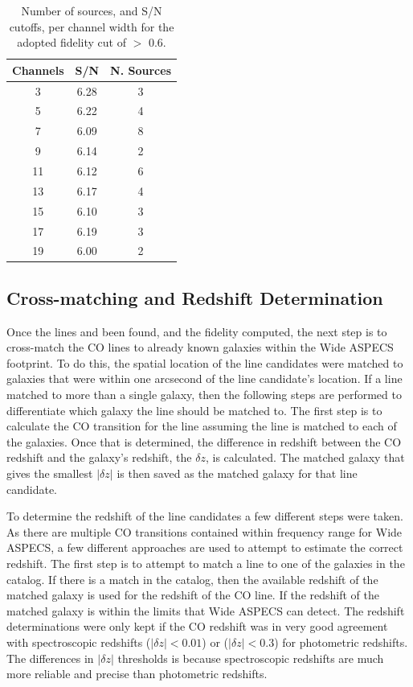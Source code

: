 \begin{table}
\centering
\caption{Number of sources, and S/N cutoffs, per channel width for the adopted fidelity cut of $>$ 0.6.}
\begin{tabular}{ccc}
Channels & S/N & N. Sources \\
\hline
3 & 6.28 & 3 \\
5 & 6.22 & 4 \\
7 & 6.09 & 8 \\
9 & 6.14 & 2 \\
11 & 6.12 & 6 \\
13 & 6.17 & 4 \\
15 & 6.10 & 3 \\
17 & 6.19 & 3 \\
19 & 6.00 & 2 \\
\end{tabular}
\end{table}\label{table:Fid_NumTable}

\subsection{Cross-matching and Redshift Determination}

Once the lines and been found, and the fidelity computed, the next step is to cross-match the CO lines to already known galaxies within the Wide ASPECS footprint. To do this, the spatial location of the line candidates were matched to galaxies that were within one arcsecond of the line candidate's location. If a line matched to more than a single galaxy, then the following steps are performed to differentiate which galaxy the line should be matched to. The first step is to calculate the CO transition for the line assuming the line is matched to each of the galaxies. Once that is determined, the difference in redshift between the CO redshift and the galaxy's redshift, the $\delta z$, is calculated. The matched galaxy that gives the smallest $|\delta z|$ is then saved as the matched galaxy for that line candidate. 

To determine the redshift of the line candidates a few different steps were taken. As there are multiple CO transitions contained within frequency range for Wide ASPECS, a few different approaches are used to attempt to estimate the correct redshift. The first step is to attempt to match a line to one of the galaxies in the catalog. If there is a match in the catalog, then the available redshift of the matched galaxy is used for the redshift of the CO line. If the redshift of the matched galaxy is within the limits that Wide ASPECS can detect. The redshift determinations were only kept if the CO redshift was in very good agreement with spectroscopic redshifts ($|\delta z| < 0.01$) or ($|\delta z| < 0.3$) for photometric redshifts. The differences in $|\delta z|$ thresholds is because spectroscopic redshifts are much more reliable and precise than photometric redshifts.

